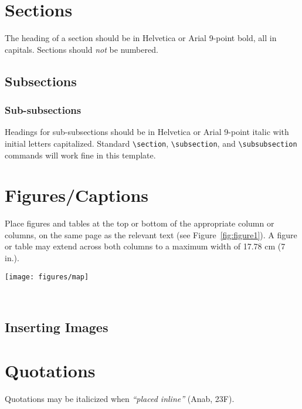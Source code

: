 \documentclass[chi_draft]{sigchi}
\begin{document}
\section{Sections}

The heading of a section should be in Helvetica or Arial 9-point bold,
all in capitals. Sections should \textit{not} be numbered.

\subsection{Subsections}



\subsubsection{Sub-subsections}

Headings for sub-subsections should be in Helvetica or Arial 9-point
italic with initial letters capitalized.  Standard
\texttt{{\textbackslash}section}, \texttt{{\textbackslash}subsection},
and \texttt{{\textbackslash}subsubsection} commands will work fine in
this template.

\section{Figures/Captions}

Place figures and tables at the top or bottom of the appropriate
column or columns, on the same page as the relevant text (see
Figure~\ref{fig:figure1}). A figure or table may extend across both
columns to a maximum width of 17.78 cm (7 in.).

\begin{figure*}
  \centering
  \texttt{[image: figures/map]}
  \caption{In this image, the map maximizes use of space. You can make
    figures as wide as you need, up to a maximum of the full width of
    both columns. Note that \LaTeX\ tends to render large figures on a
    dedicated page. Image: \ccbynd~ayman on
    Flickr.}~\label{fig:figure2}
\end{figure*}



\subsection{Inserting Images}


\section{Quotations}
Quotations may be italicized when \textit{``placed inline''} (Anab,
23F).
\end{document}
